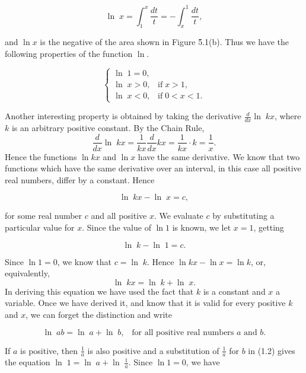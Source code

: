 $$
\ln\; x = \int_{1}^{x} \frac{dt}{t} = -\int_{x}^{1} \frac{dt}{t},
$$

\noindent and $\ln x$ is the negative of the area shown in Figure \f{5.1}(b). Thus we have the following properties of the function $\ln$.

\begin{theorem}
$$
\left \{ \begin{array}{l}
                           \ln\; 1 = 0,\\
                           \ln\; x > 0, \;\;\;\mbox{if} \;x > 1, \\
                           \ln\; x < 0, \;\;\;\mbox{if} \;0 < x < 1. 
     \end{array}
\right.
$$
\end{theorem}


Another interesting property is obtained by taking the derivative $\frac{d}{dx} \ln\; kx$, where $k$ is an arbitrary positive constant. By the Chain Rule,
$$
\frac{d}{dx} \ln\; kx = \frac{1}{kx} \frac{d}{dx} kx = \frac{1}{kx} \cdot k = \frac{1}{x}. 
$$
\noindent Hence the functions $\ln kx$ and $\ln x$ have the same derivative.
We know that two functions which have the same derivative over an interval, in this case
all positive real numbers, differ by a constant. Hence 

$$
\ln\; kx - \ln\; x = c,
$$

\noindent for some real number $c$ and all positive $x$. We evaluate $c$ by substituting a particular value for $x$. Since the value of $\ln 1$ is known, we let $x = 1$, getting 

$$\ln\; k - \ln\; 1 = c.
$$

\noindent Since $\ln 1 = 0$, we know that $c = \ln\; k$. Hence $\ln kx - \ln x = \ln k$, or, equivalently,
$$
\ln\; kx = \ln\; k + \ln\; x.
$$
\noindent In deriving this equation we have used the fact that $k$ is a constant and $x$ a variable.  Once we have derived it, and know that it is valid for every positive $k$ and $x$, we can forget the distinction and write

\begin{theorem}
$$ 
\ln\; ab = \ln\; a + \ln\; b, \;\;\;\mbox{for all positive real numbers $a$ and $b$}.
$$
\end{theorem}

If $a$ is positive, then $\frac{1}{a}$ is also positive and a substitution of $\frac{1}{a}$ for $b$ in (1.2) gives the equation $\ln\; 1 = \ln\; a + \ln\; \frac{1}{a} $. Since $\ln 1 = 0$, we have
 
